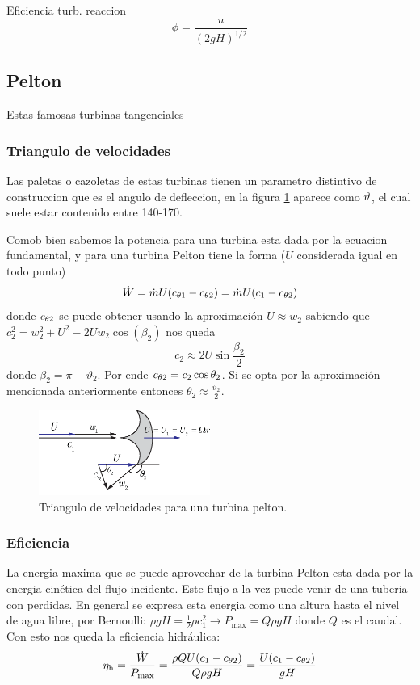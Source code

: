 \documentclass{article}
\begin{document}
Eficiencia turb. reaccion 
\[
\phi=\frac{u}{(2 g H)^{1 / 2}}
\]
\subsection{Pelton}
Estas famosas turbinas tangenciales 

\subsubsection{Triangulo de velocidades}
Las paletas o cazoletas de estas turbinas tienen un parametro distintivo de construccion que es el angulo de defleccion, en la figura \ref{fig:peltontriangle} aparece como ${\vartheta}$, el cual suele estar contenido entre 140-170. 

Comob bien sabemos la potencia para una turbina esta dada por la ecuacion fundamental, y para una turbina Pelton tiene la forma ($U$ considerada igual en todo punto)
\[
\dot{W} = \dot{m} U (c_{\theta 1}-c_{\theta 2})=\dot{m} U (c_{1}-c_{\theta 2})
\]
donde $c_{\theta 2}$ se puede obtener usando la aproximación $U\approx w_2$ sabiendo que $c_2^2=w_2^2+U^2-2Uw_2\cos (\beta_2)$ nos queda
\[
c_2 \approx 2U\sin \frac{\beta_2}{2} 
\]
donde $\beta_2 = \pi - \vartheta_2 $. Por ende $c_{\theta 2} = c_2 \cos \theta_2$. Si se opta por la aproximación mencionada anteriormente entonces $\theta_2 \approx \frac{\vartheta_2}{2}$.

\begin{figure}[htb!]
    \centering
    \includegraphics[width=0.5\textwidth]{fig/pelton_triangle.eps}
    \caption{Triangulo de velocidades para una turbina pelton.}
    \label{fig:peltontriangle}
\end{figure}

\subsubsection{Eficiencia}
La energia maxima que se puede aprovechar de la turbina Pelton esta dada por la energia cinética del flujo incidente. Este flujo a la vez puede venir de una tuberia con perdidas. En general se expresa esta energia como una altura hasta el nivel de agua libre, por Bernoulli: $\rho g H = \frac{1}{2} \rho c_1^2 \longrightarrow P_{\max} = Q\rho gH$ donde $Q$ es el caudal. Con esto nos queda la eficiencia hidráulica:
\[
 {\eta_{\mathrm{h}}} = \frac{\dot{W}}{P_{\max}} = \frac{\rho Q U(c_1-c_{\theta 2})}{Q\rho gH} = \frac{U(c_1-c_{\theta 2})}{gH}
\]
\end{document}
